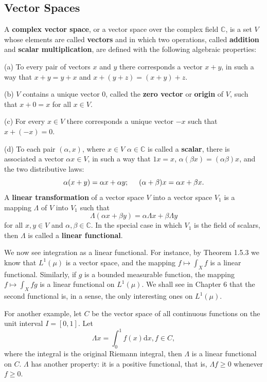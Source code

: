 \subsection{Vector Spaces}
A \textbf{complex vector space}, or a vector space over the complex field $\mathbb{C}$, is a set $V$ whose elements are called \textbf{vectors} and in which two operations, called \textbf{addition} and \textbf{scalar multiplication}, are defined with the following algebraic properties:\par
(a) To every pair of vectors $x$ and $y$ there corresponds a vector $x+y$, in such a way that $x+y=y+x$ and $x+(y+z)=(x+y)+z$.\par
(b) $V$ contains a unique vector $0$, called the \textbf{zero vector} or \textbf{origin} of $V$, such that $x+0=x$ for all $x\in V$.\par
(c) For every $x\in V$ there corresponds a unique vector $-x$ such that $x+(-x)=0$.\par
(d) To each pair $(\alpha,x)$, where $x\in V$ $\alpha\in\mathbb{C}$ is called a \textbf{scalar}, there is associated a vector $\alpha x\in V$, in such a way that $1x=x$, $\alpha(\beta x)=(\alpha \beta)x$, and the two distributive laws:
$$\alpha(x+y)=\alpha x+\alpha y;\hspace{0.5cm}(\alpha+\beta)x=\alpha x+\beta x.$$
A \textbf{linear transformation} of a vector space $V$ into a vector space $V_1$ is a mapping $\Lambda$ of $V$ into $V_1$ such that 
$$\Lambda(\alpha x+\beta y)=\alpha\Lambda x+\beta\Lambda y$$
for all $x,y\in V$ and $\alpha,\beta\in\mathbb{C}$. In the special case in which $V_1$ is the field of scalars, then $\Lambda$ is called a \textbf{linear functional}.\par
We now see integration as a linear functional. For instance, by Theorem 1.5.3 we know that $L^1(\mu)$ is a vector space, and the mapping $f\mapsto\int_X f$ is a linear functional. Similarly, if $g$ is a bounded measurable function, the mapping $f\mapsto\int_Xfg$ is a linear functional on $L^1(\mu)$. We shall see in Chapter 6 that the second functional is, in a sense, the only interesting ones on $L^1(\mu)$.\par
For another example, let $C$ be the vector space of all continuous functions on the unit interval $I=[0,1]$. Let 
$$\Lambda x=\int_0^1f(x)\mathrm{d}x,f\in C,$$
where the integral is the original Riemann integral, then $\Lambda$ is a linear functional on $C$. $\Lambda$ has another property: it is a positive functional, that is, $\Lambda f\ge 0$ whenever $f\ge 0$.\par
